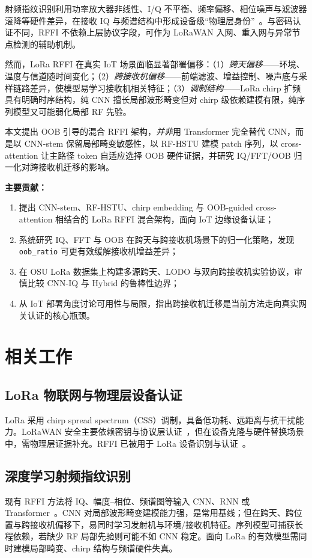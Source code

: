\documentclass[journal]{IEEEtran}
\begin{document}
射频指纹识别利用功率放大器非线性、I/Q 不平衡、频率偏移、相位噪声与滤波器滚降等硬件差异，在接收 IQ 与频谱结构中形成设备级“物理层身份”~\cite{rffi_survey}。与密码认证不同，RFFI 不依赖上层协议字段，可作为 LoRaWAN 入网、重入网与异常节点检测的辅助机制。

然而，LoRa RFFI 在真实 IoT 场景面临显著部署偏移：（1）\emph{跨天偏移}——环境、温度与信道随时间变化；（2）\emph{跨接收机偏移}——前端滤波、增益控制、噪声底与采样链路差异，使模型易学习接收机相关特征；（3）\emph{调制结构}——LoRa chirp 扩频具有明确时序结构，纯 CNN 擅长局部波形畸变但对 chirp 级依赖建模有限，纯序列模型又可能弱化局部 RF 先验。

本文提出 OOB 引导的混合 RFFI 架构，\emph{并非}用 Transformer 完全替代 CNN，而是以 CNN-stem 保留局部畸变敏感性，以 RF-HSTU 建模 patch 序列，以 cross-attention 让主路径 token 自适应选择 OOB 硬件证据，并研究 IQ/FFT/OOB 归一化对跨接收机迁移的影响。

\textbf{主要贡献：}
\begin{enumerate}
  \item 提出 CNN-stem、RF-HSTU、chirp embedding 与 OOB-guided cross-attention 相结合的 LoRa RFFI 混合架构，面向 IoT 边缘设备认证；
  \item 系统研究 IQ、FFT 与 OOB 在跨天与跨接收机场景下的归一化策略，发现 \texttt{oob\_ratio} 可更有效缓解接收机增益差异；
  \item 在 OSU LoRa 数据集上构建多源跨天、LODO 与双向跨接收机实验协议，审慎比较 CNN-IQ 与 Hybrid 的鲁棒性边界；
  \item 从 IoT 部署角度讨论可用性与局限，指出跨接收机迁移是当前方法走向真实网关认证的核心瓶颈。
\end{enumerate}

\section{相关工作}

\subsection{LoRa 物联网与物理层设备认证}
LoRa 采用 chirp spread spectrum（CSS）调制，具备低功耗、远距离与抗干扰能力。LoRaWAN 安全主要依赖密钥与协议层认证~\cite{lorawan_spec}，但在设备克隆与硬件替换场景中，需物理层证据补充。RFFI 已被用于 LoRa 设备识别与认证~\cite{osu_lora_dataset}。

\subsection{深度学习射频指纹识别}
现有 RFFI 方法将 IQ、幅度--相位、频谱图等输入 CNN、RNN 或 Transformer~\cite{rffi_survey}。CNN 对局部波形畸变建模能力强，是常用基线；但在跨天、跨位置与跨接收机偏移下，易同时学习发射机与环境/接收机特征。序列模型可捕获长程依赖，若缺少 RF 局部先验则可能不如 CNN 稳定。面向 LoRa 的有效模型需同时建模局部畸变、chirp 结构与频谱硬件失真。
\end{document}
